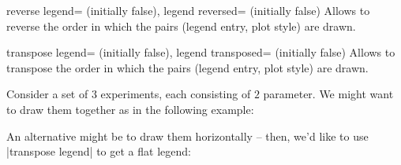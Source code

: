 \begin{pgfplotskeylist}{%
	reverse legend= (initially false),%
	legend reversed= (initially false)}
	Allows to reverse the order in which the pairs (legend entry, plot style) are drawn.
\begin{codeexample}[]
\end{codeexample}
\end{pgfplotskeylist}

\begin{pgfplotskeylist}{%
	transpose legend= (initially false),%
	legend transposed= (initially false)}
	Allows to transpose the order in which the pairs (legend entry, plot style) are drawn. 
	
	Consider a set of $3$ experiments, each consisting of $2$ parameter. We might want to draw them together as in the following example:
\begin{codeexample}[]
\end{codeexample}

	An alternative might be to draw them horizontally -- then, we'd like to use |transpose legend| to get a flat legend:
\begin{codeexample}[]
\end{codeexample}
\end{pgfplotskeylist}
